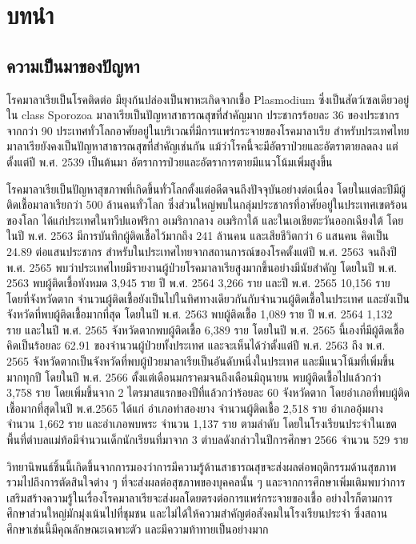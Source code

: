 \documentclass[12pt,twoside]{report}
\begin{document}
\section{บทนำ}

\subsection{ความเป็นมาของปัญหา}
โรคมาลาเรียเป็นโรคติดต่อ มียุงก้นปล่องเป็นพาหะเกิดจากเชื้อ Plasmodium ซึ่งเป็นสัตว์เซลเดียวอยู่ใน class Sporozoa มาลาเรียเป็นปัญหาสาธารณสุขที่สำคัญมาก ประชากรร้อยละ 36 ของประชากรจากกว่า 90 ประเทศทั่วโลกอาศัยอยู่ในบริเวณที่มีการแพร่กระจายของโรคมาลาเรีย สำหรับประเทศไทยมาลาเรียยังคงเป็นปัญหาสาธารณสุขที่สำคัญเช่นกัน แม้ว่าโรคนี้จะมีอัตราป่วยและอัตราตายลดลง แต่ตั้งแต่ปี พ.ศ. 2539 เป็นต้นมา อัตราการป่วยและอัตราการตายมีแนวโน้มเพิ่มสูงขึ้น

โรคมาลาเรียเป็นปัญหาสุขภาพที่เกิดขึ้นทั่วโลกตั้งแต่อดีตจนถึงปัจจุบันอย่างต่อเนื่อง โดยในแต่ละปีมีผู้ติดเชื้อมาลาเรียกว่า 500 ล้านคนทั่วโลก ซึ่งส่วนใหญ่พบในกลุ่มประชากรที่อาศัยอยู่ในประเทศเขตร้อนของโลก ได้แก่ประเทศในทวีปแอฟริกา อเมริกากลาง อเมริกาใต้ และในเอเชียตะวันออกเฉียงใต้ โดยในปี พ.ศ. 2563 มีการบันทึกผู้ติดเชื้อไว้มากถึง 241 ล้านคน และเสียชีวิตกว่า 6 แสนคน คิดเป็น 24.89 ต่อแสนประชากร สำหรับในประเทศไทยจากสถานการณ์ของโรคตั้งแต่ปี พ.ศ. 2563 จนถึงปี พ.ศ. 2565 พบว่าประเทศไทยมีรายงานผู้ป่วยโรคมาลาเรียสูงมากขึ้นอย่างมีนัยสำคัญ โดยในปี พ.ศ. 2563 พบผู้ติดเชื้อทังหมด 3,945 ราย ปี พ.ศ. 2564 3,266 ราย และปี พ.ศ. 2565 10,156 ราย โดยที่จังหวัดตาก จำนวนผู้ติดเชื้อยังเป็นไปในทิศทางเดียวกันกับจำนวนผู้ติดเชื้อในประเทศ และยังเป็นจังหวัดที่พบผู้ติดเชื้อมากที่สุด โดยในปี พ.ศ. 2563 พบผู้ติดเชื้อ 1,089 ราย ปี พ.ศ. 2564 1,132 ราย และในปี พ.ศ. 2565 จังหวัดตากพบผู้ติดเชื้อ 6,389 ราย  โดยในปี พ.ศ. 2565 นี้เองที่มีผู้ติดเชื้อคิดเป็นร้อยละ 62.91 ของจำนวนผู้ป่วยทั้งประเทศ และจะเห็นได้ว่าตั้งแต่ปี พ.ศ. 2563 ถึง พ.ศ. 2565 จังหวัดตากเป็นจังหวัดที่พบผู้ป่วยมาลาเรียเป็นอันดับหนึ่งในประเทศ และมีแนวโน้มที่เพิ่มขึ้นมากทุกปี โดยในปี พ.ศ. 2566 ตั้งแต่เดือนมกราคมจนถึงเดือนมิถุนายน พบผู้ติดเชื้อไปแล้วกว่า 3,758 ราย โดยเพิ่มขึ้นจาก 2 ไตรมาสแรกของปีที่แล้วกว่าร้อยละ 60 จังหวัดตาก โดยอำเภอที่พบผู้ติดเชื้อมากที่สุดในปี พ.ศ.2565 ได้แก่ อำเภอท่าสองยาง จำนวนผู้ติดเชื้อ 2,518 ราย อำเภออุ้มผาง จำนวน 1,662 ราย และอำเภอพบพระ จำนวน 1,137 ราย ตามลำดับ โดยในโรงเรียนประจำในเขตพื้นที่ตำบลแม่ท้อมีจำนวนเด็กนักเรียนที่มาจาก 3 ตำบลดังกล่าวในปีการศึกษา 2566 จำนวน 529 ราย

วิทยานิพนธ์ชิ้นนี้เกิดขึ้นจากการมองว่าการมีความรู้ด้านสาธารณสุขจะส่งผลต่อพฤติกรรมด้านสุขภาพ รวมไปถึงการตัดสินใจต่าง ๆ ที่จะส่งผลต่อสุขภาพของบุคคลนั้น ๆ และจากการศึกษาเพิ่มเติมพบว่าการเสริมสร้างความรู้ในเรื่องโรคมาลาเรียจะส่งผลโดยตรงต่อการแพร่กระจายของเชื้อ อย่างไรก็ตามการศึกษาส่วนใหญ่มักมุ่งเน้นไปที่ชุมชน และไม่ได้ให้ความสำคัญต่อสังคมในโรงเรียนประจำ ซึ่งสถานศึกษาเช่นนี้มีคุณลักษณะเฉพาะตัว และมีความท้าทายเป็นอย่างมาก
\end{document}
